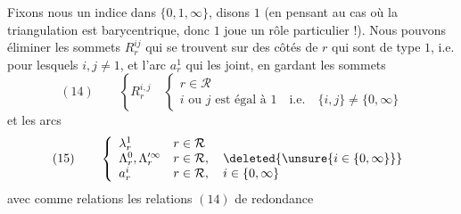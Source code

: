 
Fixons nous un indice dans $\{0,1,\infty\}$, disons $1$ (en pensant au cas où la triangulation est barycentrique, donc  $1$ joue un rôle particulier !). Nous pouvons éliminer les sommets $R_r^{ij}$ qui se trouvent sur des côtés de $r$ qui sont de type $1$, i.e. pour lesquels $i,j\ne1$, et l'arc $a_r^1$ qui les joint, en gardant les sommets
\[
(14)\qquad\left\{R_r^{i,j}\quad\left\{\begin{array}{l}
r\in\mathcal{R}\\
i\text{ ou }j\text{ est égal à }1\quad\text{i.e.}\quad\{i,j\}\ne\{0,\infty\}
\end{array}\right.\right.
\]
et les arcs
\[
(15)\qquad\left\{\begin{array}{ll}
\lambda_r^1&r\in\mathcal{R}\\
\Lambda_r^0,\Lambda_r^{\prime\infty}&r\in\mathcal{R},\quad\deleted{\unsure{i\in\{0,\infty\}}}\\
a_r^i&r\in\mathcal{R},\quad i\in\{0,\infty\}
\end{array}\right.
\]
avec comme relations les relations $(14)$ de redondance  

